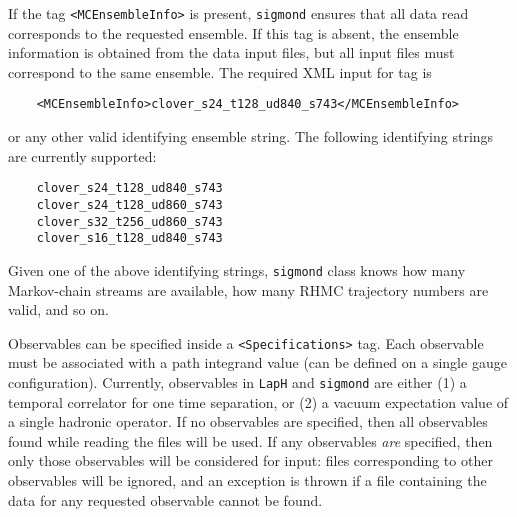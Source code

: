 \documentclass[12pt]{article}
\newcommand{\vb}{\texttt}
\begin{document}
If the tag \vb{<MCEnsembleInfo>} is present, \vb{sigmond} ensures that 
all data read corresponds to the requested ensemble.  If this tag is absent,
the ensemble information is obtained from the data input files, but all 
input files must correspond to the same ensemble. The required XML input for
tag is
\begin{verbatim}
    <MCEnsembleInfo>clover_s24_t128_ud840_s743</MCEnsembleInfo>
\end{verbatim}
or any other valid identifying ensemble string.
The following identifying strings are currently supported:
\begin{verbatim}
    clover_s24_t128_ud840_s743
    clover_s24_t128_ud860_s743
    clover_s32_t256_ud860_s743
    clover_s16_t128_ud840_s743
\end{verbatim}
Given one of the above identifying strings, \vb{sigmond} class knows how many 
Markov-chain streams are available, how many RHMC trajectory numbers are 
valid, and so on.

Observables can be specified inside a \vb{<Specifications>} tag.  Each observable
must be associated with a path integrand value (can be defined on a single gauge
configuration).  Currently, observables in \vb{LapH} and \vb{sigmond} are either
(1) a temporal correlator for one time separation, or (2) a vacuum expectation 
value of a single hadronic operator.
If no observables are specified, then all observables found while reading the 
files will be used.  If any observables \textit{are} specified, then only 
those observables will be considered for input: files corresponding to other 
observables will be ignored, and an exception is thrown if a file containing
the data for any requested observable cannot be found. 
\end{document}
